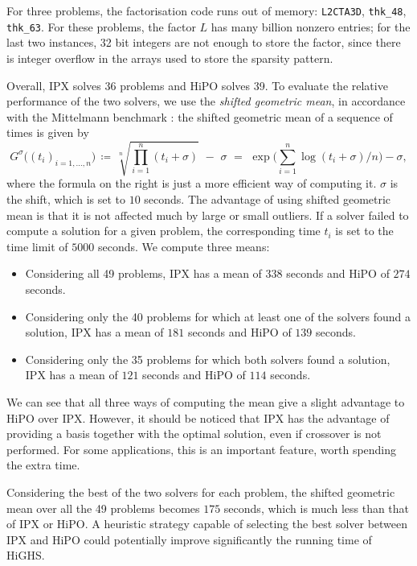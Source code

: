 \documentclass[a4paper]{article}
\newcommand{\0}{\mathbf 0}
\begin{document}
For three problems, the factorisation code runs out of memory: \texttt{L2CTA3D}, \texttt{thk\_48}, \texttt{thk\_63}. For these problems, the factor $L$ has many billion nonzero entries; for the last two instances, 32 bit integers are not enough to store the factor, since there is integer overflow in the arrays used to store the sparsity pattern.

Overall, IPX solves 36 problems and HiPO solves 39. To evaluate the relative performance of the two solvers, we use the {\it shifted geometric mean}, in accordance with the Mittelmann benchmark \cite{mittelmann}: the shifted geometric mean of a sequence of times is given by 
\[G^\sigma\big((t_i)_{i=1,\dots,n}\big)\,\coloneqq\,\sqrt[n]{\prod_{i=1}^n (t_i+\sigma)}\,\,-\,\,\sigma\,\, = \,\,\exp\Big(\sum_{i=1}^n \log(t_i+\sigma)/n\Big) - \sigma,\]
where the formula on the right is just a more efficient way of computing it. $\sigma$ is the shift, which is set to $10$ seconds. The advantage of using shifted geometric mean is that it is not affected much by large or small outliers. 
If a solver failed to compute a solution for a given problem, the corresponding time $t_i$ is set to the time limit of $5000$ seconds. We compute three means: 
\begin{itemize}
\item Considering all 49 problems, IPX has a mean of $338$ seconds and HiPO of $274$ seconds.
\item Considering only the 40 problems for which at least one of the solvers found a solution, IPX has a mean of $181$ seconds and HiPO of $139$ seconds.
\item Considering only the 35 problems for which both solvers found a solution, IPX has a mean of $121$ seconds and HiPO of $114$ seconds.
\end{itemize}

We can see that all three ways of computing the mean give a slight advantage to HiPO over IPX. However, it should be noticed that IPX has the advantage of providing a basis together with the optimal solution,  even if crossover is not performed. For some applications, this is an important feature, worth spending the extra time. 

Considering the best of the two solvers for each problem, the shifted geometric mean over all the 49 problems becomes $175$ seconds, which is much less than that of IPX or HiPO. A heuristic strategy capable of selecting the best solver between IPX and HiPO could potentially improve significantly the running time of HiGHS.
\end{document}
